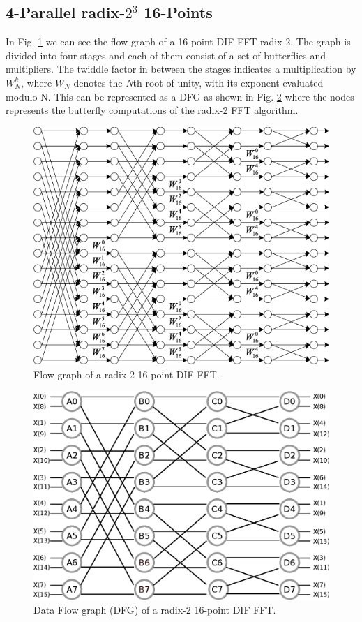 \documentclass[a4paper, 10pt, conference]{ieeeconf}
\begin{document}
\subsection{4-Parallel radix-$2^3$ 16-Points}
In Fig. \ref{fig:flowgraph_16}  we can see the flow graph of a 16-point DIF FFT radix-2. The graph is divided into four stages and each of them consist of a set of butterflies and multipliers. The twiddle factor in between the stages indicates a multiplication by $W^k_N$, where $W_N$ denotes the \textit{N}th root of unity, with its exponent evaluated modulo N. This can be represented as a DFG as shown in Fig. \ref{fig:dfg_16} where the nodes represents the butterfly computations of the radix-2 FFT algorithm. 

\begin{figure}%
\centering
\includegraphics[width=\linewidth]{Diagramas/fft16.png}%
\caption{Flow graph of a radix-2 16-point DIF FFT.}
\label{fig:flowgraph_16}
\end{figure}

\begin{figure}%
\centering
\includegraphics[width=\linewidth]{Diagramas/Butter16.eps}
\caption{Data Flow graph (DFG) of a radix-2 16-point DIF FFT.}
\label{fig:dfg_16}
\end{figure}
\end{document}
